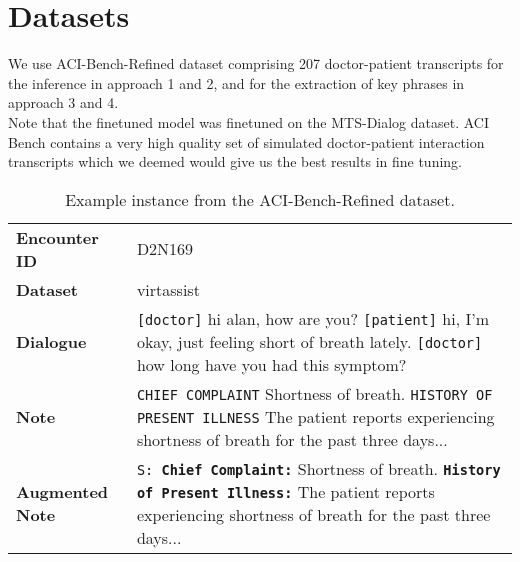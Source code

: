 \documentclass[11pt,a4paper]{article}
\begin{document}
\section{Datasets} 
We use ACI-Bench-Refined dataset comprising 207 doctor-patient transcripts for the inference in approach 1 and 2, and for the extraction of key phrases in approach 3 and 4. 
\\Note that the finetuned model was finetuned on the MTS-Dialog dataset. ACI Bench contains a very high quality set of simulated doctor-patient interaction transcripts which we deemed would give us the best results in fine tuning. 
\begin{table}[ht]
\centering
\small
\renewcommand{\arraystretch}{1.2}
\begin{tabularx}{\columnwidth}{@{}lX@{}}
\toprule
\textbf{Encounter ID} & D2N169 \\
\textbf{Dataset} & virtassist \\
\textbf{Dialogue} & \texttt{[doctor]} hi alan, how are you? \texttt{[patient]} hi, I'm okay, just feeling short of breath lately. \texttt{[doctor]} how long have you had this symptom? \\
\textbf{Note} & \texttt{CHIEF COMPLAINT} Shortness of breath. \texttt{HISTORY OF PRESENT ILLNESS} The patient reports experiencing shortness of breath for the past three days... \\
\textbf{Augmented Note} & \texttt{S: \textbf{Chief Complaint:}} Shortness of breath. \texttt{\textbf{History of Present Illness:}} The patient reports experiencing shortness of breath for the past three days... \\
\bottomrule
\end{tabularx}
\caption{Example instance from the ACI-Bench-Refined dataset.}
\label{tab:aci-example}
\end{table}


\end{document}
